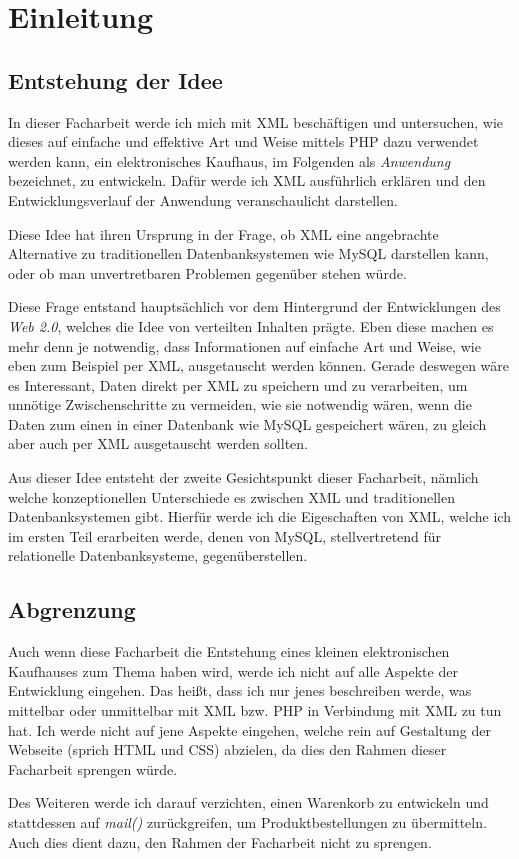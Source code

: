 

\chapter{Einleitung}
\section{Entstehung der Idee}
In dieser Facharbeit werde ich mich mit XML beschäftigen und
untersuchen, wie dieses auf einfache und effektive Art und Weise
mittels PHP dazu verwendet werden kann, ein elektronisches Kaufhaus,
im Folgenden als {\em Anwendung} bezeichnet, zu entwickeln. Dafür werde
ich XML ausführlich erklären und den Entwicklungsverlauf der Anwendung
veranschaulicht darstellen.

Diese Idee hat ihren Ursprung in der Frage, ob XML eine angebrachte
Alternative zu traditionellen Datenbanksystemen wie MySQL darstellen
kann, oder ob man unvertretbaren Problemen gegenüber stehen würde.

Diese Frage entstand hauptsächlich vor dem Hintergrund der
Entwicklungen des {\em Web 2.0}, welches die Idee von verteilten
Inhalten prägte. Eben diese machen es mehr denn je notwendig, dass
Informationen auf einfache Art und Weise, wie eben zum Beispiel per XML,
ausgetauscht werden können. Gerade deswegen wäre es Interessant, Daten
direkt per XML zu speichern und zu verarbeiten, um unnötige
Zwischenschritte zu vermeiden, wie sie notwendig wären, wenn die Daten
zum einen in einer Datenbank wie MySQL gespeichert wären, zu gleich
aber auch per XML ausgetauscht werden sollten.

Aus dieser Idee entsteht der zweite Gesichtspunkt dieser Facharbeit,
nämlich welche konzeptionellen Unterschiede es zwischen XML und
traditionellen Datenbanksystemen gibt. Hierfür werde ich die
Eigeschaften von XML, welche ich im ersten Teil erarbeiten werde,
denen von MySQL, stellvertretend für relationelle Datenbanksysteme,
gegenüberstellen.

\section{Abgrenzung}
Auch wenn diese Facharbeit die Entstehung eines kleinen elektronischen
Kaufhauses zum Thema haben wird, werde ich nicht auf alle Aspekte der
Entwicklung eingehen. Das heißt, dass ich nur jenes beschreiben werde,
was mittelbar oder unmittelbar mit XML bzw. PHP in Verbindung mit XML
zu tun hat. Ich werde nicht auf jene Aspekte eingehen, welche rein auf
Gestaltung der Webseite (sprich HTML und CSS) abzielen, da dies den
Rahmen dieser Facharbeit sprengen würde.

Des Weiteren werde ich darauf verzichten, einen Warenkorb zu
entwickeln und stattdessen auf {\em mail()} zurückgreifen, um
Produktbestellungen zu übermitteln. Auch dies dient dazu, den Rahmen
der Facharbeit nicht zu sprengen.


